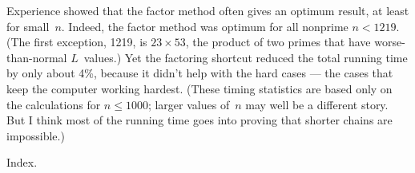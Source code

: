 Experience showed that the factor method often gives an optimum result,
at least for small~$n$. Indeed, the factor method was optimum for all
nonprime $n<1219$. (The first exception, 1219, is $23\times53$, the
product of two primes that have worse-than-normal $L$~values.)
Yet the factoring shortcut reduced the total running time by only
about 4\%, because it didn't help with the hard cases --- the cases that
keep the computer working hardest. (These timing statistics are based
only on the calculations for $n\le1000$; larger values of~$n$ may well
be a different story. But I think most of the running time goes into
proving that shorter chains are impossible.)

\fi

Index.
\fi

\inx
\fin
\con
